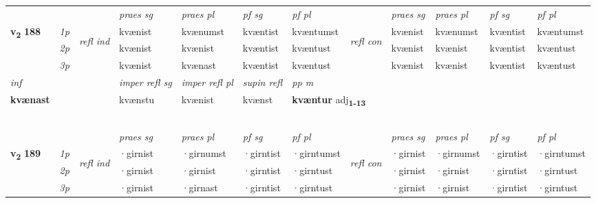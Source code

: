 \begin{longtable}[l]{X>{\footnotesize\itshape}llXXXXlXXXX}
\midrule

 & &   & \textit{praes sg}  & \textit{praes pl}    & \textit{ pf sg} & \textit{pf pl} & & \textit{praes sg}  & \textit{praes pl}    & \textit{pf sg} & \textit{pf pl }  \\ \cmidrule{4-7} \cmidrule{9-12}
 \multirow{2}{*}{{{\textbf{v{\textsubscript{2}}} \Large{\textbf{188}}}}}  & 1p & \multirow{3}{*}{\begin{turn}{90}\textit{refl ind}\end{turn}}  & kvænist & kvænumst & kvæntist & kvæntumst & \multirow{3}{*}{\begin{turn}{90}\textit{refl con}\end{turn}}  &kvænist & kvænumst & kvæntist & kvæntumst \\*
 & 2p &  & kvænist & kvænist & kvæntist & kvæntust & &kvænist & kvænist & kvæntist & kvæntust \\*
 & 3p  & & kvænist & kvænast & kvæntist & kvæntust & & kvænist & kvænist& kvæntist & kvæntust \\*
\cmidrule{4-7} \cmidrule{9-12}

   {\textit{inf}} & &   & \textit{imper refl sg} & \textit{imper refl pl}   & \textit{supin refl} & \textit{pp m} \\*
  {\textbf{kvænast}} & &   & kvænstu & kvænist   & kvænst & \multicolumn{2}{l}{\textbf{kvæntur} adj\textbf{\textsubscript{1-13}}} \\*

\midrule
  & \\*
   & \\*
     & \\*
   & \\*
  & \\
   \midrule
 & &   & \textit{praes sg}  & \textit{praes pl}    & \textit{ pf sg} & \textit{pf pl} & & \textit{praes sg}  & \textit{praes pl}    & \textit{pf sg} & \textit{pf pl }  \\ \cmidrule{4-7} \cmidrule{9-12}
 \multirow{2}{*}{{{\textbf{v{\textsubscript{2}}} \Large{\textbf{189}}}}}  & 1p & \multirow{3}{*}{\begin{turn}{90}\textit{refl ind}\end{turn}}  & ·girnist & ·girnumst & ·girntist & ·girntumst & \multirow{3}{*}{\begin{turn}{90}\textit{refl con}\end{turn}}  &·girnist & ·girnumst & ·girntist & ·girntumst \\*
 & 2p &  & ·girnist & ·girnist & ·girntist & ·girntust & &·girnist & ·girnist & ·girntist & ·girntust \\*
 & 3p  & & ·girnist & ·girnast & ·girntist & ·girntust & & ·girnist & ·girnist& ·girntist & ·girntust \\*
\cmidrule{4-7} \cmidrule{9-12}


\end{longtable}
